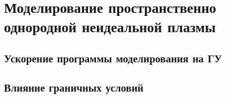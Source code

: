 \chapter{Моделирование пространственно однородной неидеальной плазмы}
\section{Ускорение программы моделирования на ГУ}
\section{Влияние граничных условий}